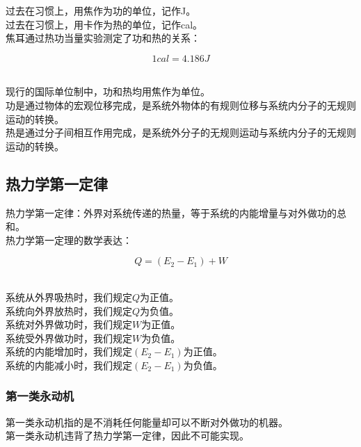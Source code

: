 \documentclass[UTF8]{ctexart}
\begin{document}
\newpage

    过去在习惯上，用焦作为功的单位，记作\si{J}。\\[3mm]
    过去在习惯上，用卡作为热的单位，记作\si{cal}。\\[3mm]
    焦耳通过热功当量实验测定了功和热的关系：
    \begin{large}
        \begin{equation*}
            1\si{cal}=4.186\si{J}
        \end{equation*}
    \end{large}\\
    现行的国际单位制中，功和热均用焦作为单位。\\[3mm]
    功是通过物体的宏观位移完成，是系统外物体的有规则位移与系统内分子的无规则运动的转换。\\[3mm]
    热是通过分子间相互作用完成，是系统外分子的无规则运动与系统内分子的无规则运动的转换。\\

\subsection{热力学第一定律}
    热力学第一定律：外界对系统传递的热量，等于系统的内能增量与对外做功的总和。\\[3mm]
    热力学第一定理的数学表达：
    \begin{large}
        \begin{equation*}
            Q=(E_2-E_1)+W
        \end{equation*}
    \end{large}\\
    系统从外界吸热时，我们规定$Q$为正值。\\[3mm]
    系统向外界放热时，我们规定$Q$为负值。\\[3mm]
    系统对外界做功时，我们规定$W$为正值。\\[3mm]
    系统受外界做功时，我们规定$W$为负值。\\[3mm]
    系统的内能增加时，我们规定$(E_2-E_1)$为正值。\\[3mm]
    系统的内能减小时，我们规定$(E_2-E_1)$为负值。

\subsubsection{第一类永动机}
    第一类永动机指的是不消耗任何能量却可以不断对外做功的机器。\\[3mm]
    第一类永动机违背了热力学第一定律，因此不可能实现。
\end{document}
